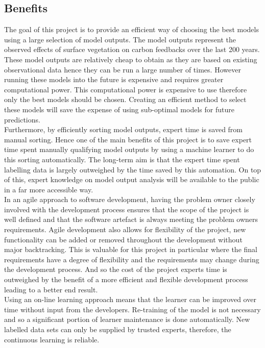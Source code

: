 \documentclass{ecmm427_assignment}
\begin{document}
\subsection{Benefits}
\quad The goal of this project is to provide an efficient way of choosing the best models using a large selection of model outputs. The model outputs represent the observed effects of surface vegetation on carbon feedbacks over the last 200 years. These model outputs are relatively cheap to obtain as they are based on existing observational data hence they can be run a large number of times. However running these models into the future is expensive and requires greater computational power. This computational power is expensive to use therefore only the best models should be chosen. Creating an efficient method to select these models will save the expense of using sub-optimal models for future predictions.\\

\quad Furthermore, by efficiently sorting model outputs, expert time is saved from manual sorting. Hence one of the main benefits of this project is to save expert time spent manually qualifying model outputs by using a machine learner to do this sorting automatically. The long-term aim is that the expert time spent labelling data is largely outweighed by the time saved by this automation. On top of this, expert knowledge on model output analysis will be available to the public in a far more accessible way.\\

\quad In an agile approach to software development, having the problem owner closely involved with the development process ensures that the scope of the project is well defined and that the software artefact is always meeting the problem owners requirements. Agile development also allows for flexibility of the project, new functionality can be added or removed throughout the development without major backtracking. This is valuable for this project in particular where the final requirements have a degree of flexibility and the requirements may change during the development process. And so the cost of the project experts time is outweighed by the benefit of a more efficient and flexible development process leading to a better end result.\\

\quad Using an on-line learning approach means that the learner can be improved over time without input from the developers. Re-training of the model is not necessary and so a significant portion of learner maintenance is done automatically. New labelled data sets can only be supplied by trusted experts, therefore, the continuous learning is reliable.\\
\end{document}
